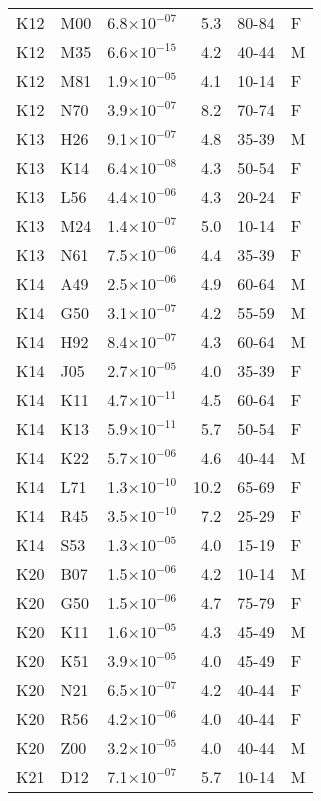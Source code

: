 \begin{longtable}{lllrll}
   K12 & M00 & 6.8$\times10^{-07}$ & 5.3 & 80-84 & F \\ 
   K12 & M35 & 6.6$\times10^{-15}$ & 4.2 & 40-44 & M \\ 
   K12 & M81 & 1.9$\times10^{-05}$ & 4.1 & 10-14 & F \\ 
   K12 & N70 & 3.9$\times10^{-07}$ & 8.2 & 70-74 & F \\ 
   K13 & H26 & 9.1$\times10^{-07}$ & 4.8 & 35-39 & M \\ 
   K13 & K14 & 6.4$\times10^{-08}$ & 4.3 & 50-54 & F \\ 
   K13 & L56 & 4.4$\times10^{-06}$ & 4.3 & 20-24 & F \\ 
   K13 & M24 & 1.4$\times10^{-07}$ & 5.0 & 10-14 & F \\ 
   K13 & N61 & 7.5$\times10^{-06}$ & 4.4 & 35-39 & F \\ 
   K14 & A49 & 2.5$\times10^{-06}$ & 4.9 & 60-64 & M \\ 
   K14 & G50 & 3.1$\times10^{-07}$ & 4.2 & 55-59 & M \\ 
   K14 & H92 & 8.4$\times10^{-07}$ & 4.3 & 60-64 & M \\ 
   K14 & J05 & 2.7$\times10^{-05}$ & 4.0 & 35-39 & F \\ 
   K14 & K11 & 4.7$\times10^{-11}$ & 4.5 & 60-64 & F \\ 
   K14 & K13 & 5.9$\times10^{-11}$ & 5.7 & 50-54 & F \\ 
   K14 & K22 & 5.7$\times10^{-06}$ & 4.6 & 40-44 & M \\ 
   K14 & L71 & 1.3$\times10^{-10}$ & 10.2 & 65-69 & F \\ 
   K14 & R45 & 3.5$\times10^{-10}$ & 7.2 & 25-29 & F \\ 
   K14 & S53 & 1.3$\times10^{-05}$ & 4.0 & 15-19 & F \\ 
   K20 & B07 & 1.5$\times10^{-06}$ & 4.2 & 10-14 & M \\ 
   K20 & G50 & 1.5$\times10^{-06}$ & 4.7 & 75-79 & F \\ 
   K20 & K11 & 1.6$\times10^{-05}$ & 4.3 & 45-49 & M \\ 
   K20 & K51 & 3.9$\times10^{-05}$ & 4.0 & 45-49 & F \\ 
   K20 & N21 & 6.5$\times10^{-07}$ & 4.2 & 40-44 & F \\ 
   K20 & R56 & 4.2$\times10^{-06}$ & 4.0 & 40-44 & F \\ 
   K20 & Z00 & 3.2$\times10^{-05}$ & 4.0 & 40-44 & M \\ 
   K21 & D12 & 7.1$\times10^{-07}$ & 5.7 & 10-14 & M \\ 

\end{longtable}

